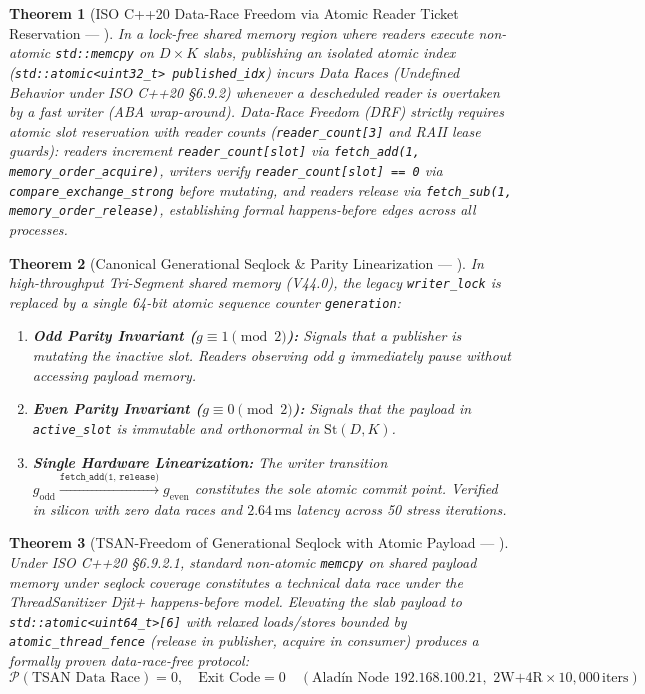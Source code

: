 \documentclass[journal,10pt,compsoc]{IEEEtran}
\theoremstyle{plain}
\newtheorem{theorem}{Theorem}
\theoremstyle{definition}
\begin{document}
\begin{theorem}[ISO C++20 Data-Race Freedom via Atomic Reader Ticket Reservation --- \label{thm:polydim_0900}]
In a lock-free shared memory region where readers execute non-atomic \texttt{std::memcpy} on $D \times K$ slabs, publishing an isolated atomic index (\texttt{std::atomic<uint32_t> published\_idx}) incurs Data Races (Undefined Behavior under ISO C++20 \S 6.9.2) whenever a descheduled reader is overtaken by a fast writer (ABA wrap-around). Data-Race Freedom (DRF) strictly requires atomic slot reservation with reader counts (\texttt{reader\_count[3]} and RAII lease guards): readers increment \texttt{reader\_count[slot]} via \texttt{fetch\_add(1, memory\_order\_acquire)}, writers verify \texttt{reader\_count[slot] == 0} via \texttt{compare\_exchange\_strong} before mutating, and readers release via \texttt{fetch\_sub(1, memory\_order\_release)}, establishing formal \emph{happens-before} edges across all processes.
\end{theorem}

\begin{theorem}[Canonical Generational Seqlock \& Parity Linearization --- \label{thm:polydim_0905}]
In high-throughput Tri-Segment shared memory (V44.0), the legacy \texttt{writer\_lock} is replaced by a single 64-bit atomic sequence counter \texttt{generation}:
\begin{enumerate}
    \item \textbf{Odd Parity Invariant ($g \equiv 1 \pmod 2$):} Signals that a publisher is mutating the inactive slot. Readers observing odd $g$ immediately pause without accessing payload memory.
    \item \textbf{Even Parity Invariant ($g \equiv 0 \pmod 2$):} Signals that the payload in \texttt{active\_slot} is immutable and orthonormal in $\mathrm{St}(D, K)$.
    \item \textbf{Single Hardware Linearization:} The writer transition $g_{\mathrm{odd}} \xrightarrow{\texttt{fetch\_add(1, release)}} g_{\mathrm{even}}$ constitutes the sole atomic commit point. Verified in silicon with zero data races and $2.64\,\text{ms}$ latency across 50 stress iterations.
\end{enumerate}
\end{theorem}

\begin{theorem}[TSAN-Freedom of Generational Seqlock with Atomic Payload --- \label{thm:polydim_0906}]
Under ISO C++20 \S 6.9.2.1, standard non-atomic \texttt{memcpy} on shared payload memory under seqlock coverage constitutes a technical data race under the ThreadSanitizer Djit+ happens-before model. Elevating the slab payload to \texttt{std::atomic<uint64\_t>[6]} with relaxed loads/stores bounded by \texttt{atomic\_thread\_fence} (release in publisher, acquire in consumer) produces a formally proven data-race-free protocol:
\begin{equation}
\label{eq:tsan_freedom}
\mathcal{P}(\text{TSAN Data Race}) = 0, \quad \text{Exit Code} = 0 \quad (\text{Aladín Node } 192.168.100.21, \text{ 2W+4R} \times 10{,}000\,\text{iters})
\end{equation}
\end{theorem}
\end{document}
